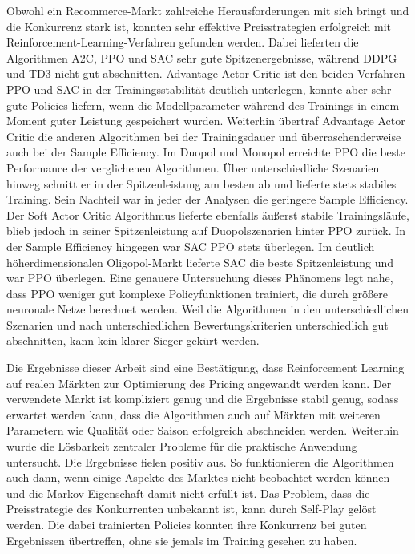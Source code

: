 Obwohl ein Recommerce-Markt zahlreiche Herausforderungen mit sich bringt und die Konkurrenz stark ist, konnten sehr effektive Preisstrategien erfolgreich mit Reinforcement-Learning-Verfahren gefunden werden.
Dabei lieferten die Algorithmen A2C, PPO und SAC sehr gute Spitzenergebnisse, während DDPG und TD3 nicht gut abschnitten.
Advantage Actor Critic ist den beiden Verfahren PPO und SAC in der Trainingsstabilität deutlich unterlegen, konnte aber sehr gute Policies liefern, wenn die Modellparameter während des Trainings in einem Moment guter Leistung gespeichert wurden.
Weiterhin übertraf Advantage Actor Critic die anderen Algorithmen bei der Trainingsdauer und überraschenderweise auch bei der Sample Efficiency.
Im Duopol und Monopol erreichte PPO die beste Performance der verglichenen Algorithmen.
Über unterschiedliche Szenarien hinweg schnitt er in der Spitzenleistung am besten ab und lieferte stets stabiles Training.
Sein Nachteil war in jeder der Analysen die geringere Sample Efficiency.
Der Soft Actor Critic Algorithmus lieferte ebenfalls äußerst stabile Trainingsläufe, blieb jedoch in seiner Spitzenleistung auf Duopolszenarien hinter PPO zurück.
In der Sample Efficiency hingegen war SAC PPO stets überlegen.
Im deutlich höherdimensionalen Oligopol-Markt lieferte SAC die beste Spitzenleistung und war PPO überlegen.
Eine genauere Untersuchung dieses Phänomens legt nahe, dass PPO weniger gut komplexe Policyfunktionen trainiert, die durch größere neuronale Netze berechnet werden.
Weil die Algorithmen in den unterschiedlichen Szenarien und nach unterschiedlichen Bewertungskriterien unterschiedlich gut abschnitten, kann kein klarer Sieger gekürt werden.

Die Ergebnisse dieser Arbeit sind eine Bestätigung, dass Reinforcement Learning auf realen Märkten zur Optimierung des Pricing angewandt werden kann.
Der verwendete Markt ist kompliziert genug und die Ergebnisse stabil genug, sodass erwartet werden kann, dass die Algorithmen auch auf Märkten mit weiteren Parametern wie Qualität oder Saison erfolgreich abschneiden werden.
Weiterhin wurde die Lösbarkeit zentraler Probleme für die praktische Anwendung untersucht.
Die Ergebnisse fielen positiv aus.
So funktionieren die Algorithmen auch dann, wenn einige Aspekte des Marktes nicht beobachtet werden können und die Markov-Eigenschaft damit nicht erfüllt ist.
Das Problem, dass die Preisstrategie des Konkurrenten unbekannt ist, kann durch Self-Play gelöst werden.
Die dabei trainierten Policies konnten ihre Konkurrenz bei guten Ergebnissen übertreffen, ohne sie jemals im Training gesehen zu haben.


